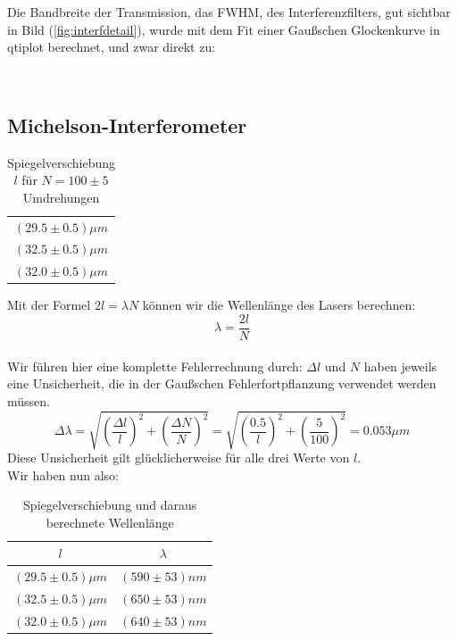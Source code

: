 \documentclass{article}
\begin{document}
Die Bandbreite der Transmission, das FWHM, des Interferenzfilters, gut sichtbar in Bild (\ref{fig:interfdetail}), wurde mit dem Fit einer Gaußschen Glockenkurve in qtiplot berechnet, und zwar direkt zu:
\begin{flushleft}
 \\
\end{flushleft}

\subsection{Michelson-Interferometer}
\begin{table}[H]
\begin{center}
\begin{tabular}{c}
$(29.5\pm 0.5)\mu m$\\
$(32.5\pm 0.5)\mu m$\\
$(32.0\pm 0.5)\mu m$\\
\end{tabular}
\caption{Spiegelverschiebung $l$ für $N=100 \pm 5$ Umdrehungen}
\end{center}
\end{table}
\vspace{0.3mm}

Mit der Formel $2 l=\lambda N$ können wir die Wellenlänge des Lasers berechnen:
$$\lambda=\frac{2l}{N}$$
\\
Wir führen hier eine komplette Fehlerrechnung durch:
$\Delta l$ und $N$ haben jeweils eine Unsicherheit, die in der Gaußschen Fehlerfortpflanzung verwendet werden müssen.\\
$$\Delta \lambda=\sqrt{\left(\frac{\Delta l}{l}\right)^2+\left(\frac{\Delta N}{N}\right)^2}=\sqrt{\left(\frac{0.5}{l}\right)^2+\left(\frac{5}{100}\right)^2}=0.053 \mu m$$
Diese Unsicherheit gilt glücklicherweise für alle drei Werte von $l$.\\
Wir haben nun also: 
\begin{table}[H]
\begin{center}
\begin{tabular}{|c|c|}
\hline
$l$ & $\lambda$\\
\hline
$(29.5\pm 0.5)\mu m$ & $(590 \pm 53)nm$\\
$(32.5\pm 0.5)\mu m$ & $(650 \pm 53)nm$\\
$(32.0\pm 0.5)\mu m$ & $(640 \pm 53)nm$\\
\hline
\end{tabular}
\caption{Spiegelverschiebung und daraus berechnete Wellenlänge}
\end{center}
\end{table}
\vspace{0.3mm}
\end{document}
